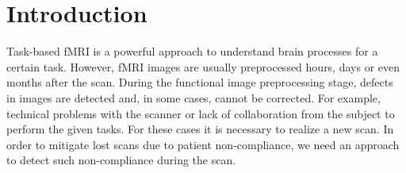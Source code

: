 \documentclass[twocolumn]{bmcart}%
\begin{document}
\begin{frontmatter}
\begin{fmbox}


	








%
\end{fmbox}%

\end{frontmatter}


\section{Introduction}\label{introduction}

Task-based fMRI is a powerful approach to understand brain processes for
a certain task. However, fMRI images are usually preprocessed hours,
days or even months after the scan. During the functional image
preprocessing stage, defects in images are detected and, in some cases,
cannot be corrected. For example, technical problems with the scanner or
lack of collaboration from the subject to perform the given tasks. For
these cases it is necessary to realize a new scan. In order to mitigate
lost scans due to patient non-compliance, we need an approach to detect
such non-compliance during the scan.
\end{document}
